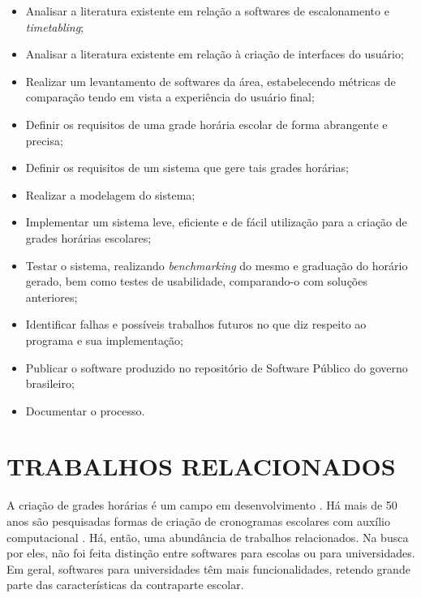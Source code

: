 \documentclass[12pt,a4paper]{article}
\begin{document}
				\begin{itemize}
					\item Analisar a literatura existente em relação a softwares de escalonamento e \textit{timetabling};
					\item Analisar a literatura existente em relação à criação de interfaces do usuário;
					\item Realizar um levantamento de softwares da área, estabelecendo métricas de comparação tendo em vista a experiência do usuário final;
					\item Definir os requisitos de uma grade horária escolar de forma abrangente e precisa;
					\item Definir os requisitos de um sistema que gere tais grades horárias;
					\item Realizar a modelagem do sistema;
					\item Implementar um sistema leve, eficiente e de fácil utilização para a criação de grades horárias escolares;
					\item Testar o sistema, realizando \textit{benchmarking} do mesmo e graduação do horário gerado, bem como testes de usabilidade, comparando-o com soluções anteriores;
					\item Identificar falhas e possíveis trabalhos futuros no que diz respeito ao programa e sua implementação;
					\item Publicar o software produzido no repositório de Software Público do governo brasileiro;
					\item Documentar o processo.
				\end{itemize}

	\clearpage

	\section{TRABALHOS RELACIONADOS}

		\par A criação de grades horárias é um campo em desenvolvimento \cite{patat2020}. Há mais de 50 anos são pesquisadas formas de criação de cronogramas escolares com auxílio computacional \cite{appleby}. Há, então, uma abundância de trabalhos relacionados. Na busca por eles, não foi feita distinção entre softwares para escolas ou para universidades. Em geral, softwares para universidades têm mais funcionalidades, retendo grande parte das características da contraparte escolar.
\end{document}
